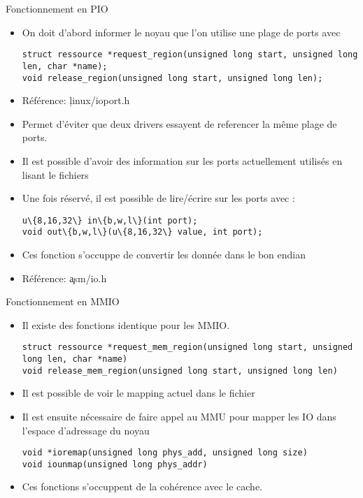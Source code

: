 \begin{frame}[fragile=singleslide]{Fonctionnement en PIO}
  \begin{itemize} 
  \item On doit  d'abord informer le noyau que  l'on utilise une plage
    de ports avec
    \begin{lstlisting} 
struct ressource *request_region(unsigned long start, unsigned long len, char *name);
void release_region(unsigned long start, unsigned long len);
    \end{lstlisting} 
  \item Référence: \c{linux/ioport.h}
  \item  Permet d'éviter que  deux drivers  essayent de  referencer la
    même plage de ports.
  \item  Il  est  possible  d'avoir  des  information  sur  les  ports
    actuellement utilisés en lisant le fichiers 
  \item Une fois réservé, il est possible de lire/écrire sur les ports
    avec :
\begin{lstlisting} 
u\{8,16,32\} in\{b,w,l\}(int port);
void out\{b,w,l\}(u\{8,16,32\} value, int port);
\end{lstlisting} 
  \item Ces  fonction s'occuppe  de convertir les  donnée dans  le bon
    endian
  \item Référence: \c{asm/io.h}
  \end{itemize} 
\end{frame} 

\begin{frame}[fragile=singleslide]{Fonctionnement en MMIO}
  \begin{itemize} 
  \item Il existe des fonctions identique pour les MMIO.
    \begin{lstlisting} 
struct ressource *request_mem_region(unsigned long start, unsigned long len, char *name)
void release_mem_region(unsigned long start, unsigned long len)
    \end{lstlisting} 
  \item  Il est possible  de voir  le mapping  actuel dans  le fichier
  \item Il  est ensuite nécessaire de  faire appel au  MMU pour mapper
    les IO dans l'espace d'adressage du noyau
    \begin{lstlisting} 
void *ioremap(unsigned long phys_add, unsigned long size)
void iounmap(unsigned long phys_addr)
    \end{lstlisting}  
  \item Ces fonctions s'occuppent de la cohérence avec le cache.
\end{itemize} 
\end{frame}

